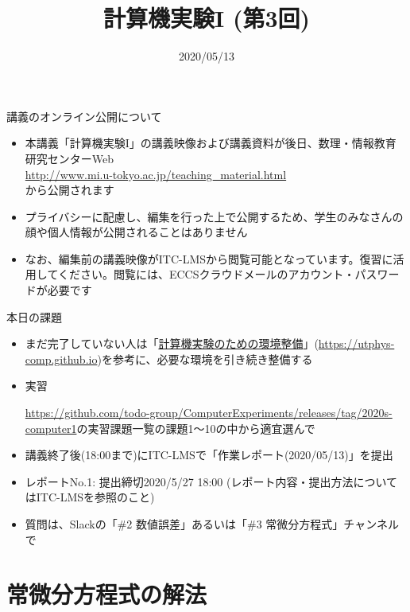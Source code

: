 \documentclass[10pt,dvipdfmx]{beamer}
\title{計算機実験I (第3回)}
\date{2020/05/13}
\begin{document}
\begin{frame}
  \titlepage
  \tableofcontents
\end{frame}

\begin{frame}[t]{講義のオンライン公開について}
  \begin{itemize}
    \setlength{\itemsep}{1em}
  \item 本講義「計算機実験I」の講義映像および講義資料が後日、数理・情報教育研究センターWeb \\
    \hspace*{1em} \url{http://www.mi.u-tokyo.ac.jp/teaching_material.html} \\
    から公開されます
  \item プライバシーに配慮し、編集を行った上で公開するため、学生のみなさんの顔や個人情報が公開されることはありません

    \vspace*{4em}
  \item なお、編集前の講義映像がITC-LMSから閲覧可能となっています。復習に活用してください。閲覧には、ECCSクラウドメールのアカウント・パスワードが必要です
  \end{itemize}
\end{frame}

\begin{frame}[t]{本日の課題}
  \begin{itemize}
  \item まだ完了していない人は「\href{https://utphys-comp.github.io}{計算機実験のための環境整備}」({\small \href{https://utphys-comp.github.io}{https://utphys-comp.github.io}})を参考に、必要な環境を引き続き整備する
  \item 実習
    
    \url{https://github.com/todo-group/ComputerExperiments/releases/tag/2020s-computer1}の実習課題一覧の課題1〜10の中から適宜選んで
    
  \item 講義終了後(18:00まで)にITC-LMSで「作業レポート(2020/05/13)」を提出
  \item レポートNo.1: 提出締切2020/5/27 18:00 (レポート内容・提出方法についてはITC-LMSを参照のこと)
  \item 質問は、Slackの「\#2 数値誤差」あるいは「\#3 常微分方程式」チャンネルで
  \end{itemize}
\end{frame}

\section{常微分方程式の解法}
\end{document}
